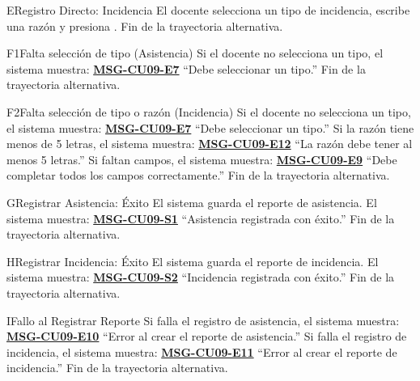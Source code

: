 \begin{UCtrayectoriaA}{E}{Registro Directo: Incidencia}
	\UCpaso[\UCactor] El docente selecciona un tipo de incidencia, escribe una razón y presiona . 
	\UCpaso Fin de la trayectoria alternativa.
\end{UCtrayectoriaA}

\begin{UCtrayectoriaA}{F1}{Falta selección de tipo (Asistencia)}
	\UCpaso Si el docente no selecciona un tipo, el sistema muestra: \textbf{\hyperref[msg:CU09-E7]{MSG-CU09-E7}} ``Debe seleccionar un tipo.''
	\UCpaso Fin de la trayectoria alternativa.
\end{UCtrayectoriaA}

\begin{UCtrayectoriaA}{F2}{Falta selección de tipo o razón (Incidencia)}
	\UCpaso Si el docente no selecciona un tipo, el sistema muestra: \textbf{\hyperref[msg:CU09-E7]{MSG-CU09-E7}} ``Debe seleccionar un tipo.''
	\UCpaso Si la razón tiene menos de 5 letras, el sistema muestra: \textbf{\hyperref[msg:CU09-E12]{MSG-CU09-E12}} ``La razón debe tener al menos 5 letras.''
	\UCpaso Si faltan campos, el sistema muestra: \textbf{\hyperref[msg:CU09-E9]{MSG-CU09-E9}} ``Debe completar todos los campos correctamente.''
	\UCpaso Fin de la trayectoria alternativa.
\end{UCtrayectoriaA}

\begin{UCtrayectoriaA}{G}{Registrar Asistencia: Éxito}
	\UCpaso El sistema guarda el reporte de asistencia.
	\UCpaso El sistema muestra: \textbf{\hyperref[msg:CU09-S1]{MSG-CU09-S1}} ``Asistencia registrada con éxito.''
	\UCpaso Fin de la trayectoria alternativa.
\end{UCtrayectoriaA}

\begin{UCtrayectoriaA}{H}{Registrar Incidencia: Éxito}
	\UCpaso El sistema guarda el reporte de incidencia.
	\UCpaso El sistema muestra: \textbf{\hyperref[msg:CU09-S2]{MSG-CU09-S2}} ``Incidencia registrada con éxito.''
	\UCpaso Fin de la trayectoria alternativa.
\end{UCtrayectoriaA}

\begin{UCtrayectoriaA}{I}{Fallo al Registrar Reporte}
	\UCpaso Si falla el registro de asistencia, el sistema muestra: \textbf{\hyperref[msg:CU09-E10]{MSG-CU09-E10}} ``Error al crear el reporte de asistencia.''
	\UCpaso Si falla el registro de incidencia, el sistema muestra: \textbf{\hyperref[msg:CU09-E11]{MSG-CU09-E11}} ``Error al crear el reporte de incidencia.''
	\UCpaso Fin de la trayectoria alternativa.
\end{UCtrayectoriaA}

